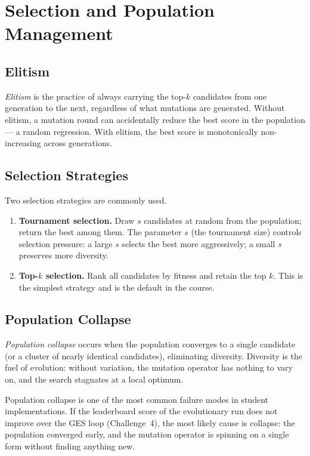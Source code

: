 \section{Selection and Population Management}
\label{section:Selection}

\subsection{Elitism}

\emph{Elitism} is the practice of always carrying the top-$k$ candidates from one generation to the next, regardless of what mutations are generated.
Without elitism, a mutation round can accidentally reduce the best score in the population — a random regression.
With elitism, the best score is monotonically non-increasing across generations.

\subsection{Selection Strategies}

Two selection strategies are commonly used.

\begin{enumerate}
\item \textbf{Tournament selection.}
Draw $s$ candidates at random from the population; return the best among them.
The parameter $s$ (the tournament size) controls selection pressure: a large $s$ selects the best more aggressively; a small $s$ preserves more diversity.

\item \textbf{Top-$k$ selection.}
Rank all candidates by fitness and retain the top $k$.
This is the simplest strategy and is the default in the course.
\end{enumerate}

\subsection{Population Collapse}

\emph{Population collapse} occurs when the population converges to a single candidate (or a cluster of nearly identical candidates), eliminating diversity.
Diversity is the fuel of evolution: without variation, the mutation operator has nothing to vary on, and the search stagnates at a local optimum.

\begin{remark}
Population collapse is one of the most common failure modes in student implementations.
If the leaderboard score of the evolutionary run does not improve over the GES loop (Challenge~4), the most likely cause is collapse: the population converged early, and the mutation operator is spinning on a single form without finding anything new.
\end{remark}

